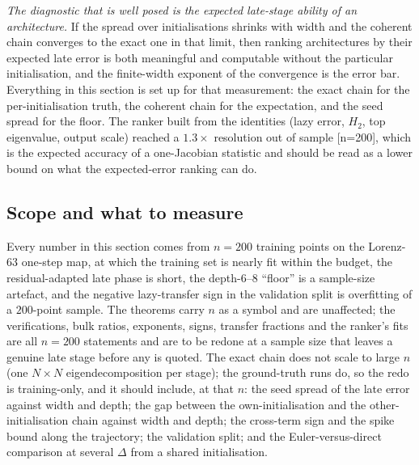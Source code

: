 \emph{The diagnostic that is well posed is the expected late-stage ability of an
architecture.} If the spread over initialisations shrinks with width and the
coherent chain converges to the exact one in that limit, then ranking
architectures by their expected late error is both meaningful and computable
without the particular initialisation, and the finite-width exponent of the
convergence is the error bar. Everything in this section is set up for that
measurement: the exact chain for the per-initialisation truth, the coherent
chain for the expectation, and the seed spread for the floor. The ranker
built from the identities (lazy error, $H_2$, top eigenvalue, output scale)
reached a $1.3\times$ resolution out of sample [n=200], which is the expected
accuracy of a one-Jacobian statistic and should be read as a lower bound on
what the expected-error ranking can do.

\subsection{Scope and what to measure}
\label{ssec:chain-scope}

Every number in this section comes from $n=200$ training points on the
Lorenz-63 one-step map, at which the training set is nearly fit within the
budget, the residual-adapted late phase is short, the depth-$6$--$8$ ``floor'' is a
sample-size artefact, and the negative lazy-transfer sign in the validation
split is overfitting of a $200$-point sample. The theorems carry $n$ as a symbol
and are unaffected; the verifications, bulk ratios, exponents, signs, transfer
fractions and the ranker's fits are all $n=200$ statements and are to be redone
at a sample size that leaves a genuine late stage before any is quoted. The
exact chain does not scale to large $n$ (one $N\times N$ eigendecomposition per
stage); the ground-truth runs do, so the redo is training-only, and it should
include, at that $n$: the seed spread of the late error against width and
depth; the gap between the own-initialisation and the other-initialisation
chain against width and depth; the cross-term sign and the spike bound along
the trajectory; the validation split; and the Euler-versus-direct comparison
at several $\Delta$ from a shared initialisation.
